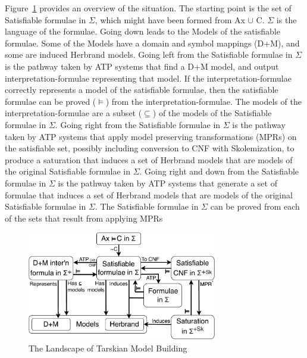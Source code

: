 \documentclass{easychair}
\begin{document}
Figure~\ref{ModelLandscape} provides an overview of the situation.
The starting point is the set of {\sf Satisfiable formulae in $\Sigma$}, which might have been
formed from {\sf Ax $\cup$ {\raisebox{0.4ex}{\texttildelow}}C}. 
$\Sigma$ is the language of the formulae.
Going down leads to the {\sf Models} of the satisfiable formulae.
Some of the {\sf Models} have a domain and symbol mappings ({\sf D+M}), and some are induced 
Herbrand models.
Going left from the {\sf Satisfiable formulae in $\Sigma$} is the pathway taken by ATP systems 
that find a {\sf D+M} model, and output interpretation-formulae representing that model.
If the interpretation-formulae correctly represents a model of the satisfiable formulae, then
the satisfiable formulae can be proved ($\vDash$) from the interpretation-formulae.
The models of the interpretation-formulae are a subset ($\subseteq$) of the models of the
{\sf Satisfiable formulae in $\Sigma$}.
Going right from the {\sf Satisfiable formulae in $\Sigma$} is the pathway taken by ATP systems
that apply model preserving transformations ({\sf MPR}s) on the satisfiable set, possibly 
including conversion to CNF with Skolemization, to produce a saturation that induces a set of 
Herbrand models that are models of the original {\sf Satisfiable formulae in $\Sigma$}.
Going right and down from the {\sf Satisfiable formulae in $\Sigma$} is the pathway taken by ATP 
systems that generate a set of formulae that induces a set of
Herbrand models that are models of the original {\sf Satisfiable formulae in $\Sigma$}.
The {\sf Satisfiable formulae in $\Sigma$} can be proved from each of the sets that result from 
applying MPRs

\begin{figure}[htbp]
\centering
\includegraphics[width=0.75\textwidth]{ModelLandscape.pdf}
\caption{The Landscape of Tarskian Model Building}
\label{ModelLandscape}
\end{figure}
\end{document}
